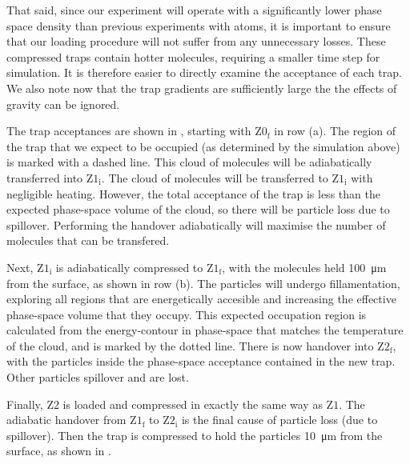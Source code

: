 That said, since our experiment will operate with a significantly lower phase
space density than previous experiments with atoms, it is important to ensure
that our loading procedure will not suffer from any unnecessary losses. These
compressed traps contain hotter molecules, requiring a smaller time step for
simulation. It is therefore easier to directly examine the acceptance of each
trap. We also note now that the trap gradients are sufficiently large the the
effects of gravity can be ignored.

The trap acceptances are shown in ,
starting with $\mathrm{Z0_f}$ in row (a). The region of the trap that we expect
to be occupied (as determined by the simulation above) is marked with a dashed
line.  This cloud of molecules will be adiabatically transferred into
$\mathrm{Z1_i}$.
%
The cloud of molecules will be transferred to $\mathrm{Z1_i}$ with negligible
heating. However, the total acceptance of the trap is less than the expected
phase-space volume of the cloud, so there will be particle loss due to
spillover.  Performing the handover adiabatically will maximise the number of
molecules that can be transfered.

Next, $\mathrm{Z1_i}$ is adiabatically compressed to $\mathrm{Z1_f}$, with the
molecules held \SI{100}{\micro\meter} from the surface, as shown in row (b). The particles will
undergo fillamentation, 
exploring all regions that are energetically accesible and increasing the effective phase-space volume that they
occupy. This expected occupation region is calculated from the energy-contour in
phase-space that matches the temperature of the cloud, and is marked by the
dotted line. There is now handover into $\mathrm{Z2_f}$, with the particles
inside the phase-space acceptance contained in the new trap. Other particles
spillover and are lost.

Finally, $\mathrm{Z2}$ is loaded and compressed in exactly the same way as
$\mathrm{Z1}$. The adiabatic handover from $\mathrm{Z1_f}$ to $\mathrm{Z2_i}$
is the final cause of particle loss (due to spillover). Then the trap is
compressed to hold the particles \SI{10}{\micro\meter} from the surface, as
shown in .

